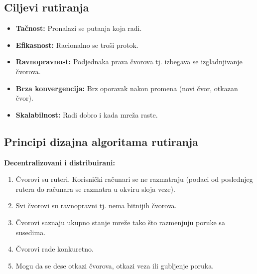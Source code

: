 \documentclass[a4paper]{article}
\begin{document}
    \subsection{Ciljevi rutiranja}
    \begin{itemize}
        \item \textbf{Tačnost:} Pronalazi se putanja koja radi.
        \item \textbf{Efikasnost:} Racionalno se troši protok.
        \item \textbf{Ravnopravnost:} Podjednaka prava čvorova tj. izbegava se izgladnjivanje čvorova.
        \item \textbf{Brza konvergencija:} Brz oporavak nakon promena (novi čvor, otkazan čvor).
        \item \textbf{Skalabilnost:} Radi dobro i kada mreža raste.
    \end{itemize}

    \subsection{Principi dizajna algoritama rutiranja}
    \noindent \textbf{Decentralizovani i distribuirani:}
    \begin{enumerate}
        \item Čvorovi su ruteri. Korisnički računari se ne razmatraju (podaci od poslednjeg
              rutera do računara se razmatra u okviru sloja veze).
        \item Svi čvorovi su ravnopravni tj. nema bitnijih čvorova.
        \item Čvorovi saznaju ukupno stanje mreže tako što razmenjuju poruke sa susedima.
        \item Čvorovi rade konkuretno.
        \item Mogu da se dese otkazi čvorova, otkazi veza ili gubljenje poruka. 
    \end{enumerate}
\end{document}

